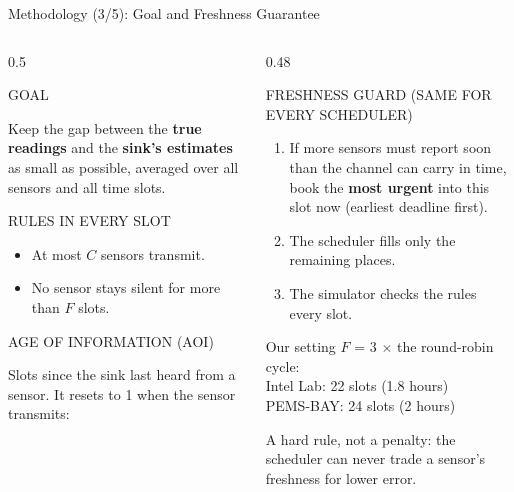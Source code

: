 \documentclass[aspectratio=169,10pt,xcolor=table]{beamer}
\newcommand{\sect}[1]{\par{\color{muted}\scriptsize\MakeUppercase{#1}}\par\vspace{0.2em}}
\begin{document}
\begin{frame}{Methodology (3/5): Goal and Freshness Guarantee}
  \begin{columns}[T]
    \begin{column}{0.5\textwidth}
      \sect{Goal}
      \begin{block}{}
        \small Keep the gap between the \textbf{true readings} and the \textbf{sink's estimates} as small as possible,
        averaged over all sensors and all time slots.
      \end{block}
      \sect{Rules in every slot}
      \begin{itemize}\small
        \item At most $C$ sensors transmit.
        \item No sensor stays silent for more than $F$ slots.
      \end{itemize}
      \sect{Age of Information (AoI)}
      {\small Slots since the sink last heard from a sensor. It resets to 1 when the sensor transmits:}\\[0.3em]
    \end{column}
    \begin{column}{0.48\textwidth}
      \sect{Freshness guard (same for every scheduler)}
      \begin{enumerate}\small\setlength\itemsep{0.25em}
        \item If more sensors must report soon than the channel can carry in time, book the \textbf{most urgent} into
              this slot now (earliest deadline first).
        \item The scheduler fills only the remaining places.
        \item The simulator checks the rules every slot.
      \end{enumerate}
      \begin{block}{Our setting}
        \small $F$ = 3 $\times$ the round-robin cycle:\\
        Intel Lab: 22 slots (1.8 hours)\\
        PEMS-BAY: 24 slots (2 hours)
      \end{block}
      {\scriptsize\color{muted} A hard rule, not a penalty: the scheduler can never trade a sensor's freshness for
      lower error.}
    \end{column}
  \end{columns}
\end{frame}
\end{document}
